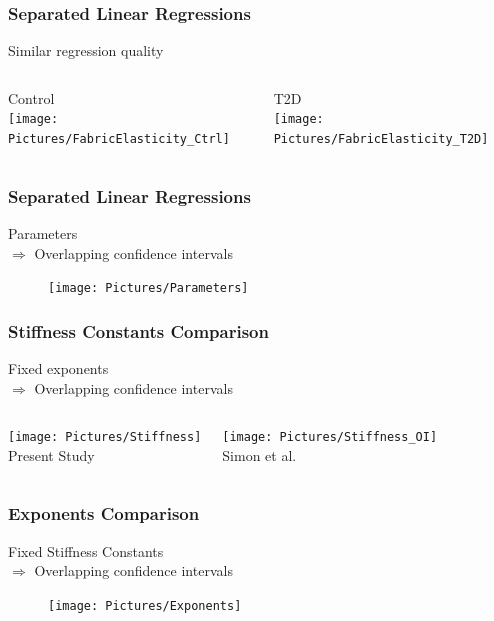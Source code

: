 \documentclass[xcolor=table,11pt]{beamer}
\begin{document}
	\begin{frame}
		\frametitle{Separated Linear Regressions}
		Similar regression quality\\\vfill
		\begin{columns}
			\centering
			Control\\
			\texttt{[image: Pictures/FabricElasticity\_Ctrl]}
				
			\centering
			T2D\\
			\texttt{[image: Pictures/FabricElasticity\_T2D]}
		\end{columns}
	\end{frame}

	\begin{frame}
		\frametitle{Separated Linear Regressions}
		Parameters\\
		$\Rightarrow$ Overlapping confidence intervals\\\vfill
		\begin{figure}
			\centering
			\texttt{[image: Pictures/Parameters]}
		\end{figure}
	\end{frame}

	\begin{frame}
		\frametitle{Stiffness Constants Comparison}
		Fixed exponents\\
		$\Rightarrow$ Overlapping confidence intervals\\\vfill
		\begin{columns}
			\column[t]{0.5\linewidth}
			\centering
			\texttt{[image: Pictures/Stiffness]}\\
			Present Study

			\column[t]{0.5\linewidth}
			\centering
			\texttt{[image: Pictures/Stiffness\_OI]}\\
			Simon et al. \cite{p2}
		\end{columns}
	\end{frame}
		
	\begin{frame}
		\frametitle{Exponents Comparison}
		Fixed Stiffness Constants\\
		$\Rightarrow$ Overlapping confidence intervals\\\vfill
		\begin{figure}
			\centering
			\texttt{[image: Pictures/Exponents]}
		\end{figure}
	\end{frame}

\end{document}
